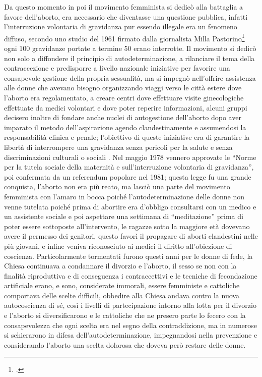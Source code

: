 Da questo momento in poi il movimento femminista si dedicò alla battaglia a favore dell'aborto, era necessario che diventasse una questione pubblica, infatti l'interruzione volontaria di gravidanza pur essendo illegale era un fenomeno diffuso, secondo uno studio del 1961 firmato dalla giornalista Milla Pastorino\footcite{Pastorino} ogni 100 gravidanze portate a termine 50 erano interrotte.
Il movimento  si dedicò non solo a diffondere il principio di autodeterminazione, a rilanciare il tema della contraccezione e predisporre a livello nazionale iniziative per favorire una consapevole gestione della propria sessualità, ma si impegnò nell'offrire assistenza alle donne che avevano bisogno organizzando viaggi verso le città estere dove l'aborto era regolamentato, a creare centri dove effettuare visite ginecologiche effettuate da medici volontari e dove poter reperire informazioni, alcuni gruppi decisero inoltre di fondare anche nuclei di autogestione dell'aborto dopo aver imparato il metodo dell'aspirazione agendo clandestinamente e assumendosi la responsabilità clinica e penale; l'obiettivo di queste iniziative era di garantire la libertà di interrompere una gravidanza senza pericoli per la salute e senza discriminazioni culturali o sociali .
Nel maggio 1978 vennero approvate le \enquote{Norme per la tutela sociale della maternità e sull'interruzione volontaria di gravidanza}, poi confermata da un referendum popolare nel 1981; questa legge fu una grande conquista, l'aborto non era più reato, ma lasciò una parte del movimento femminista con l'amaro in bocca poiché l'autodeterminazione delle donne non venne tutelata poiché prima di abortire era d'obbligo consultarsi con un medico e un assistente sociale e poi aspettare una settimana di \enquote{meditazione} prima di poter essere sottoposte all'intervento, le ragazze sotto la maggiore età dovevano avere il permesso dei genitori, questo favorì il propagare di aborti clandestini nelle più giovani, e infine veniva riconosciuto ai medici il diritto all'obiezione di coscienza.
Particolarmente tormentati furono questi anni per le donne di fede, la Chiesa continuava a condannare il divorzio e l'aborto, il sesso se non con la finalità riproduttiva e di conseguenza i contraccettivi e le tecniche di fecondazione artificiale erano, e sono, considerate immorali, essere femministe e cattoliche comportava delle scelte difficili, obbedire alla Chiesa andava contro la nuova autocoscienza di sé, così i livelli di partecipazione intorno alla lotta per il divorzio e l'aborto si diversificarono e le cattoliche che ne presero parte lo fecero con la consapevolezza che ogni scelta era nel segno della contraddizione, ma in numerose si schierarono in difesa dell'autodeterminazione, impegnandosi nella prevenzione e considerando l'aborto una scelta dolorosa che doveva però restare delle donne.

